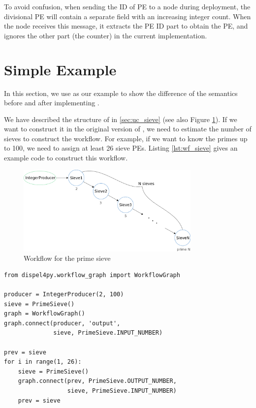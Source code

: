 To avoid confusion, when sending the ID of PE to a node during deployment, the divisional PE will contain a separate field with an increasing integer count. When the node receives this message, it extracts the PE ID part to obtain the PE, and ignores the other part (\ie the counter) in the current implementation.

\section{Simple Example}
In this section, we use \ttsieve as our example to show the difference of the semantics before and after implementing \tdynexp.

We have described the structure of \ttsieve in \ref{sec:uc_sieve} (see also Figure \ref{fig:sieve_static}). If we want to construct it in the original version of \dpy, we need to estimate the number of sieves to construct the workflow. For example, if we want to know the primes up to 100, we need to assign at least 26 sieve PEs. Listing \ref{lst:wf_sieve} gives an example code to construct this workflow.

\begin{figure}[h]\centering
    \includegraphics[width=0.8\textwidth]{figures/sieve_static}
	\caption{Workflow for the prime sieve}	\label{fig:sieve_static}
\end{figure}

\begin{lstlisting}[frame=single,caption={Example code of the sieve workflow construction in the old semantics (suppose IntegerProducer and PrimeSieve are already defined},captionpos=b,label={lst:wf_sieve}]
from dispel4py.workflow_graph import WorkflowGraph

producer = IntegerProducer(2, 100)
sieve = PrimeSieve()
graph = WorkflowGraph()
graph.connect(producer, 'output',
              sieve, PrimeSieve.INPUT_NUMBER)

prev = sieve
for i in range(1, 26):
    sieve = PrimeSieve()
    graph.connect(prev, PrimeSieve.OUTPUT_NUMBER,
                  sieve, PrimeSieve.INPUT_NUMBER)
    prev = sieve
\end{lstlisting}


